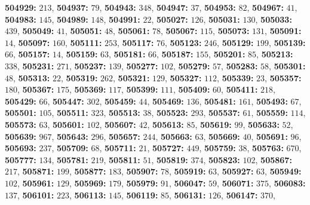\textsf{\bfseries 504929:} $213$, \textsf{\bfseries 504937:} $79$, \textsf{\bfseries 504943:} $348$, \textsf{\bfseries 504947:} $37$, \textsf{\bfseries 504953:} $82$, \textsf{\bfseries 504967:} $41$, \textsf{\bfseries 504983:} $145$, \textsf{\bfseries 504989:} $148$, \textsf{\bfseries 504991:} $22$, \textsf{\bfseries 505027:} $126$, \textsf{\bfseries 505031:} $130$, \textsf{\bfseries 505033:} $439$, \textsf{\bfseries 505049:} $41$, \textsf{\bfseries 505051:} $48$, \textsf{\bfseries 505061:} $78$, \textsf{\bfseries 505067:} $115$, \textsf{\bfseries 505073:} $131$, \textsf{\bfseries 505091:} $14$, \textsf{\bfseries 505097:} $160$, \textsf{\bfseries 505111:} $253$, \textsf{\bfseries 505117:} $76$, \textsf{\bfseries 505123:} $246$, \textsf{\bfseries 505129:} $199$, \textsf{\bfseries 505139:} $66$, \textsf{\bfseries 505157:} $14$, \textsf{\bfseries 505159:} $63$, \textsf{\bfseries 505181:} $66$, \textsf{\bfseries 505187:} $155$, \textsf{\bfseries 505201:} $85$, \textsf{\bfseries 505213:} $338$, \textsf{\bfseries 505231:} $271$, \textsf{\bfseries 505237:} $139$, \textsf{\bfseries 505277:} $102$, \textsf{\bfseries 505279:} $57$, \textsf{\bfseries 505283:} $58$, \textsf{\bfseries 505301:} $48$, \textsf{\bfseries 505313:} $22$, \textsf{\bfseries 505319:} $262$, \textsf{\bfseries 505321:} $129$, \textsf{\bfseries 505327:} $112$, \textsf{\bfseries 505339:} $23$, \textsf{\bfseries 505357:} $180$, \textsf{\bfseries 505367:} $175$, \textsf{\bfseries 505369:} $117$, \textsf{\bfseries 505399:} $111$, \textsf{\bfseries 505409:} $60$, \textsf{\bfseries 505411:} $218$, \textsf{\bfseries 505429:} $66$, \textsf{\bfseries 505447:} $302$, \textsf{\bfseries 505459:} $44$, \textsf{\bfseries 505469:} $136$, \textsf{\bfseries 505481:} $161$, \textsf{\bfseries 505493:} $67$, \textsf{\bfseries 505501:} $105$, \textsf{\bfseries 505511:} $323$, \textsf{\bfseries 505513:} $38$, \textsf{\bfseries 505523:} $293$, \textsf{\bfseries 505537:} $61$, \textsf{\bfseries 505559:} $114$, \textsf{\bfseries 505573:} $63$, \textsf{\bfseries 505601:} $102$, \textsf{\bfseries 505607:} $42$, \textsf{\bfseries 505613:} $85$, \textsf{\bfseries 505619:} $99$, \textsf{\bfseries 505633:} $52$, \textsf{\bfseries 505639:} $967$, \textsf{\bfseries 505643:} $296$, \textsf{\bfseries 505657:} $244$, \textsf{\bfseries 505663:} $63$, \textsf{\bfseries 505669:} $40$, \textsf{\bfseries 505691:} $96$, \textsf{\bfseries 505693:} $237$, \textsf{\bfseries 505709:} $68$, \textsf{\bfseries 505711:} $21$, \textsf{\bfseries 505727:} $449$, \textsf{\bfseries 505759:} $38$, \textsf{\bfseries 505763:} $670$, \textsf{\bfseries 505777:} $134$, \textsf{\bfseries 505781:} $219$, \textsf{\bfseries 505811:} $51$, \textsf{\bfseries 505819:} $374$, \textsf{\bfseries 505823:} $102$, \textsf{\bfseries 505867:} $217$, \textsf{\bfseries 505871:} $199$, \textsf{\bfseries 505877:} $183$, \textsf{\bfseries 505907:} $78$, \textsf{\bfseries 505919:} $63$, \textsf{\bfseries 505927:} $63$, \textsf{\bfseries 505949:} $102$, \textsf{\bfseries 505961:} $129$, \textsf{\bfseries 505969:} $179$, \textsf{\bfseries 505979:} $91$, \textsf{\bfseries 506047:} $59$, \textsf{\bfseries 506071:} $375$, \textsf{\bfseries 506083:} $137$, \textsf{\bfseries 506101:} $223$, \textsf{\bfseries 506113:} $145$, \textsf{\bfseries 506119:} $85$, \textsf{\bfseries 506131:} $126$, \textsf{\bfseries 506147:} $370$, 
